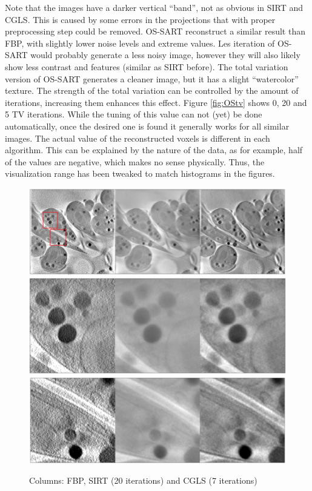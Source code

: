 Note that the images have a darker vertical ``band'', not as obvious in SIRT and CGLS. This is caused by some errors in the projections that with proper preprocessing step could be removed. OS-SART reconstruct a similar result than FBP, with slightly lower noise levels and extreme values. Les iteration of OS-SART would probably generate a less noisy image, however they will also likely show less contrast and features (similar as SIRT before). The total variation version of OS-SART generates a cleaner image, but it has a slight ``watercolor'' texture. The strength of the total variation can be controlled by the amount of iterations, increasing them enhances this effect. Figure \ref{fig:OStv} shows 0, 20 and 5 TV iterations. While the tuning of this value can not (yet) be done automatically, once the desired one is found it generally works for all similar images. The actual value of the reconstructed voxels is different in each algorithm. This can be explained by the nature of the data, as for example, half of the values are negative, which makes no sense physically. Thus, the visualization range has been tweaked to match histograms in the figures.


\begin{figure}
\begin{center}

\includegraphics[width=\textwidth]{Applications/FBP_SIRT_CGLSm.png} 
\includegraphics[width=\textwidth]{Applications/FBP_SIRT_CGLSz1.png} 
\includegraphics[width=\textwidth]{Applications/FBP_SIRT_CGLSz2.png} 

\end{center}

\caption{\label{fig:CGLSSIRT} Columns: FBP, SIRT (20 iterations) and CGLS (7 iterations)} 
\end{figure}


